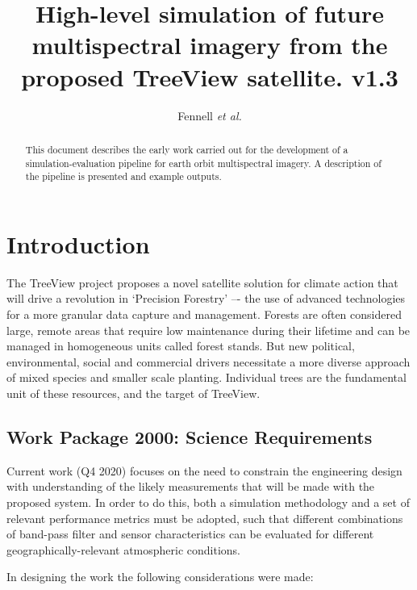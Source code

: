 \documentclass[10pt,a4paper,final,onecolumn]{article}
\author{Fennell \textit{et al.}}
\title{High-level simulation of future multispectral imagery from the proposed TreeView satellite. v1.3}
\begin{document}
\maketitle
\begin{abstract}
This document describes the early work carried out for the development of a simulation-evaluation pipeline for earth orbit multispectral imagery. A description of the pipeline is presented and example outputs.
\end{abstract}
\section{Introduction}
The TreeView project proposes a novel satellite solution for climate action that will drive a revolution in ‘Precision Forestry’ –- the use of advanced technologies for a more granular data capture and management. Forests are often considered large, remote areas that require low maintenance during their lifetime and can be managed in homogeneous units called forest stands. But new political, environmental, social and commercial drivers necessitate a more diverse approach of mixed species and smaller scale planting. Individual trees are the fundamental unit of these resources, and the target of TreeView. 

\subsection{Work Package 2000: Science Requirements}
Current work (Q4 2020) focuses on the need to constrain the engineering design with understanding of the likely measurements that will be made with the proposed system. In order to do this, both a simulation methodology and a set of relevant performance metrics must be adopted, such that different combinations of band-pass filter and sensor characteristics can be evaluated for different geographically-relevant atmospheric conditions.

In designing the work the following considerations were made:
\end{document}
